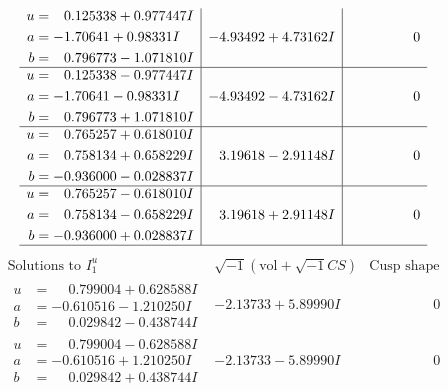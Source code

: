 \documentclass[1p]{elsarticle_modified}
\theoremstyle{definition}
\newcommand{\I}{\sqrt{-1}}
\begin{document}
$$\begin{array}{c|c|c}
\begin{aligned}
u &= \phantom{-}0.125338 + 0.977447 I \\
a &= -1.70641 + 0.98331 I \\
b &= \phantom{-}0.796773 - 1.071810 I\end{aligned}
 & -4.93492 + 4.73162 I & \phantom{-0.000000 } 0 \\ \hline\begin{aligned}
u &= \phantom{-}0.125338 - 0.977447 I \\
a &= -1.70641 - 0.98331 I \\
b &= \phantom{-}0.796773 + 1.071810 I\end{aligned}
 & -4.93492 - 4.73162 I & \phantom{-0.000000 } 0 \\ \hline\begin{aligned}
u &= \phantom{-}0.765257 + 0.618010 I \\
a &= \phantom{-}0.758134 + 0.658229 I \\
b &= -0.936000 - 0.028837 I\end{aligned}
 & \phantom{-}3.19618 - 2.91148 I & \phantom{-0.000000 } 0 \\ \hline\begin{aligned}
u &= \phantom{-}0.765257 - 0.618010 I \\
a &= \phantom{-}0.758134 - 0.658229 I \\
b &= -0.936000 + 0.028837 I\end{aligned}
 & \phantom{-}3.19618 + 2.91148 I & \phantom{-0.000000 } 0\\
 \hline 
 \end{array}$$\newpage$$\begin{array}{c|c|c}  
\text{Solutions to }I^u_{1}& \I (\text{vol} + \sqrt{-1}CS) & \text{Cusp shape}\\
 \hline 
\begin{aligned}
u &= \phantom{-}0.799004 + 0.628588 I \\
a &= -0.610516 - 1.210250 I \\
b &= \phantom{-}0.029842 - 0.438744 I\end{aligned}
 & -2.13733 + 5.89990 I & \phantom{-0.000000 } 0 \\ \hline\begin{aligned}
u &= \phantom{-}0.799004 - 0.628588 I \\
a &= -0.610516 + 1.210250 I \\
b &= \phantom{-}0.029842 + 0.438744 I\end{aligned}
 & -2.13733 - 5.89990 I & \phantom{-0.000000 } 0 \\ \hline\begin{aligned}

\end{aligned}
\end{array}$$
\end{document}
